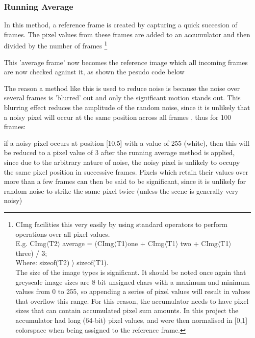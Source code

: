 \documentclass[11pt]{article} %
\begin{document}
{{\subsubsection{Running Average}
In this method, a reference frame is created by capturing a quick succesion of frames. The pixel values from these frames are added to an accumulator and then divided by the number of frames  
\footnote{CImg facilities this very easily by using standard operators to perform operations over all pixel values.
\\ E.g.  CImg\(\langle\)T2\(\rangle\) average =  (CImg\(\langle\)T1\(\rangle\)one + CImg\(\langle\)T1\(\rangle\) two + CImg\(\langle\)T1\(\rangle\) three) / 3; \\
Where: sizeof(T2)  \(\rangle\)  sizeof(T1).
\\The size of the image types is significant. It should be noted once again that greyscale image sizes are 8-bit unsigned chars with a maximum and minimum values from 0 to 255, so appending a series of pixel values will result in values that overflow this range. For this reason, the accumulator needs to have pixel sizes that can contain accumulated pixel sum amounts. In this project the accumulator had long (64-bit) pixel values, and were then normalised in [0,1] colorspace when being assigned to the reference frame.}
 
This 'average frame' now becomes the reference image which all incoming frames are now checked against it, as shown the pesudo code below

\begin{frame}{}
	\vspace{-20pt}
	
\end{frame}

The reason a method like this is used to reduce noise is because the noise over several frames is 'blurred' out and only the significant motion stands out. This blurring effect reduces the amplitude of the random noise, since it is unlikely that a noisy pixel will occur at the same position across all frames , thus for 100 frames:

if a noisy pixel occurs at position [10,5] with a value of 255 (white), then this will be reduced to a pixel value of 3 after the running average method is applied, since due to the arbitrary nature of noise, the noisy pixel is unlikely to occupy the same pixel position in successive frames. Pixels which retain their values over more than a few frames can then be said to be significant, since it is unlikely for random noise to strike the same pixel twice (unless the scene is generally very noisy)

}}
\end{document}
